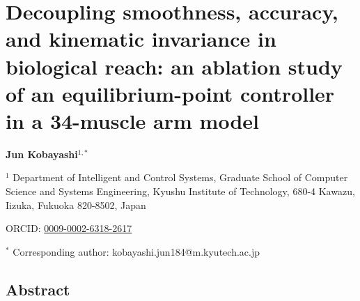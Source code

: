 \documentclass[
  11pt,
]{article}
\author{}
\date{}
\begin{document}
\hypertarget{decoupling-smoothness-accuracy-and-kinematic-invariance-in-biological-reach-an-ablation-study-of-an-equilibrium-point-controller-in-a-34-muscle-arm-model}{%
\section{Decoupling smoothness, accuracy, and kinematic invariance in
biological reach: an ablation study of an equilibrium-point controller
in a 34-muscle arm
model}\label{decoupling-smoothness-accuracy-and-kinematic-invariance-in-biological-reach-an-ablation-study-of-an-equilibrium-point-controller-in-a-34-muscle-arm-model}}

\textbf{Jun Kobayashi}\(^{1,*}\)

\(^{1}\) Department of Intelligent and Control Systems, Graduate School
of Computer Science and Systems Engineering, Kyushu Institute of
Technology, 680-4 Kawazu, Iizuka, Fukuoka 820-8502, Japan

ORCID: \href{https://orcid.org/0009-0002-6318-2617}{0009-0002-6318-2617}

\(^{*}\) Corresponding author: kobayashi.jun184@m.kyutech.ac.jp

\hypertarget{abstract}{%
\subsection{Abstract}\label{abstract}}
\end{document}
